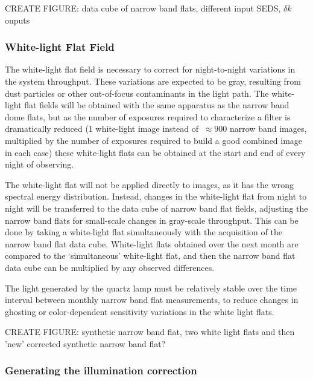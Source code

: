 \documentclass[12pt,preprint]{aastex}
\begin{document}
CREATE FIGURE: data cube of narrow band flats, different input SEDS,
$\delta k$ ouputs

\subsubsection{White-light Flat Field}

The white-light flat field is necessary to correct for night-to-night
variations in the system throughput. These variations are expected to
be gray, resulting from dust particles or other out-of-focus
contaminants in the light path. The white-light flat fields will be
obtained with the same apparatus as the narrow band dome flats, but as
the number of exposures required to characterize a filter is
dramatically reduced (1 white-light image instead of $~\approx900$
narrow band images, multiplied by the number of exposures required to
build a good combined image in each case) these white-light flats can
be obtained at the start and end of every night of observing.

The white-light flat will not be applied directly to images, as it has
the wrong spectral energy distribution. Instead, changes in the
white-light flat from night to night will be transferred to the data
cube of narrow band flat fields, adjusting the narrow band flats for
small-scale changes in gray-scale throughput. This can be done by taking a
white-light flat simultaneously with the acquisition of the narrow
band flat data cube. White-light flats obtained over the next month
are compared to the `simultaneous' white-light flat, and then the
narrow band flat data cube can be multiplied by any observed differences.

The light generated by the quartz lamp must be relatively stable over
the time interval between monthly narrow band flat measurements, to
reduce changes in ghosting or color-dependent sensitivity variations
in the white light flats.

CREATE FIGURE: synthetic narrow band flat, two white light flats and then 'new'
corrected synthetic narrow band flat?

\subsubsection{Generating the illumination correction}
\end{document}
